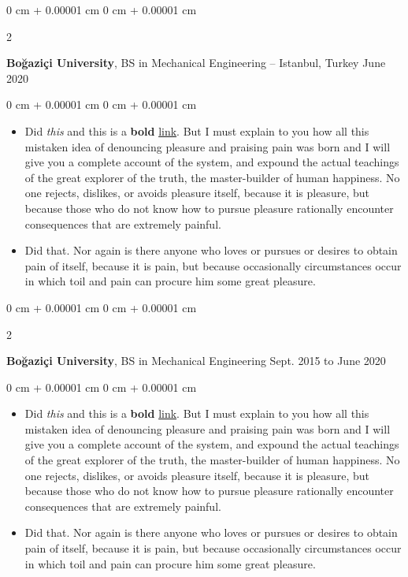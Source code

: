 \documentclass[10pt, letterpaper]{article}
\newenvironment{highlights}{
    \begin{itemize}[
        topsep=0.10 cm,
        parsep=0.10 cm,
        partopsep=0pt,
        itemsep=0pt,
        leftmargin=0 cm + 10pt
    ]
}{
    \end{itemize}
} %
\newenvironment{onecolentry}{
    \begin{adjustwidth}{
        0 cm + 0.00001 cm
    }{
        0 cm + 0.00001 cm
    }
}{
    \end{adjustwidth}
} %
\newenvironment{twocolentry}[2][]{
    \onecolentry
    \def\secondColumn{#2}
    \setcolumnwidth{\fill, 4.5 cm}
    \begin{paracol}{2}
}{
    \switchcolumn \raggedleft \secondColumn
    \end{paracol}
    \endonecolentry
} %
\begin{document}
        \vspace{0.2 cm}

        \begin{twocolentry}{
            June 2020
        }
            \textbf{Boğaziçi University}, BS in Mechanical Engineering -- Istanbul, Turkey\end{twocolentry}

        \vspace{0.10 cm}
        \begin{onecolentry}
            \begin{highlights}
                \item Did \textit{this} and this is a \textbf{bold} \href{https://example.com}{link}. But I must explain to you how all this mistaken idea of denouncing pleasure and praising pain was born and I will give you a complete account of the system, and expound the actual teachings of the great explorer of the truth, the master-builder of human happiness. No one rejects, dislikes, or avoids pleasure itself, because it is pleasure, but because those who do not know how to pursue pleasure rationally encounter consequences that are extremely painful.
                \item Did that. Nor again is there anyone who loves or pursues or desires to obtain pain of itself, because it is pain, but because occasionally circumstances occur in which toil and pain can procure him some great pleasure.
            \end{highlights}
        \end{onecolentry}


        \vspace{0.2 cm}

        \begin{twocolentry}{
            Sept. 2015 to June 2020
        }
            \textbf{Boğaziçi University}, BS in Mechanical Engineering\end{twocolentry}

        \vspace{0.10 cm}
        \begin{onecolentry}
            \begin{highlights}
                \item Did \textit{this} and this is a \textbf{bold} \href{https://example.com}{link}. But I must explain to you how all this mistaken idea of denouncing pleasure and praising pain was born and I will give you a complete account of the system, and expound the actual teachings of the great explorer of the truth, the master-builder of human happiness. No one rejects, dislikes, or avoids pleasure itself, because it is pleasure, but because those who do not know how to pursue pleasure rationally encounter consequences that are extremely painful.
                \item Did that. Nor again is there anyone who loves or pursues or desires to obtain pain of itself, because it is pain, but because occasionally circumstances occur in which toil and pain can procure him some great pleasure.
            \end{highlights}
        \end{onecolentry}
\end{document}
